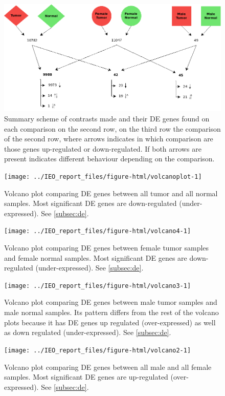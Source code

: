 \documentclass[9pt,twocolumn,twoside]{gsajnl}
\begin{document}
\begin{figure}
\includegraphics[width=\linewidth]{scheme}
\caption{Summary scheme of contrasts made and their DE genes found on each comparison on the second row, on the third row the comparison of the second row, where arrows indicates in which comparison are those genes up-regulated or down-regulated. If both arrows are present indicates different behaviour depending on the comparison.}
\label{fig:scheme}
\end{figure}

\begin{figure}
\texttt{[image: ../IEO\_report\_files/figure-html/volcanoplot-1]}
\caption{Volcano plot comparing DE genes between all tumor and all normal samples. Most significant DE genes are down-regulated (under-expressed). See \ref{subsec:de}.}
\label{fig:volcano1}
\end{figure}

\begin{figure}
\texttt{[image: ../IEO\_report\_files/figure-html/volcano4-1]}
\caption{Volcano plot comparing DE genes between female tumor samples and female normal samples. Most significant DE genes are down-regulated (under-expressed). See \ref{subsec:de}.}
\label{fig:volcano2}
\end{figure}

\begin{figure}
\texttt{[image: ../IEO\_report\_files/figure-html/volcano3-1]}
\caption{Volcano plot comparing DE genes between male tumor samples and male normal samples. Its pattern differs from the rest of the volcano plots because it has DE genes up regulated (over-expressed) as well as down regulated (under-expressed). See \ref{subsec:de}.}
\label{fig:volcano3}
\end{figure}

\begin{figure}
\texttt{[image: ../IEO\_report\_files/figure-html/volcano2-1]}
\caption{Volcano plot comparing DE genes between all male and all female samples. Most significant DE genes are up-regulated (over-expressed). See \ref{subsec:de}.}
\label{fig:volcano4}
\end{figure}
\end{document}
